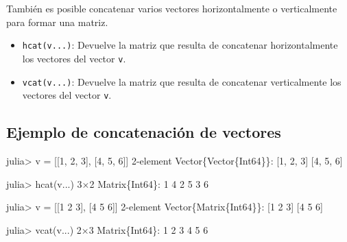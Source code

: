 \documentclass[
  letterpaper,
  DIV=11,
  numbers=noendperiod]{scrreprt}
\newenvironment{Shaded}{\begin{snugshade}}{\end{snugshade}}
\newcommand{\DataTypeTok}[1]{\textcolor[rgb]{0.68,0.00,0.00}{#1}}
\newcommand{\FloatTok}[1]{\textcolor[rgb]{0.68,0.00,0.00}{#1}}
\newcommand{\FunctionTok}[1]{\textcolor[rgb]{0.28,0.35,0.67}{#1}}
\newcommand{\NormalTok}[1]{\textcolor[rgb]{0.00,0.23,0.31}{#1}}
\newcommand{\OperatorTok}[1]{\textcolor[rgb]{0.37,0.37,0.37}{#1}}
\providecommand{\tightlist}{%
  \setlength{\itemsep}{0pt}\setlength{\parskip}{0pt}}\usepackage{longtable,booktabs,array}
\begin{document}
También es posible concatenar varios vectores horizontalmente o
verticalmente para formar una matriz.

\begin{itemize}
\tightlist
\item
  \texttt{hcat(v...)}: Devuelve la matriz que resulta de concatenar
  horizontalmente los vectores del vector \texttt{v}.
\item
  \texttt{vcat(v...)}: Devuelve la matriz que resulta de concatenar
  verticalmente los vectores del vector \texttt{v}.
\end{itemize}

\hypertarget{ejemplo-de-concatenaciuxf3n-de-vectores}{%
\subsection{Ejemplo de concatenación de
vectores}\label{ejemplo-de-concatenaciuxf3n-de-vectores}}

\begin{Shaded}
\begin{Highlighting}[]
\NormalTok{julia}\OperatorTok{\textgreater{}}\NormalTok{ v }\OperatorTok{=}\NormalTok{ [[}\FloatTok{1}\NormalTok{, }\FloatTok{2}\NormalTok{, }\FloatTok{3}\NormalTok{], [}\FloatTok{4}\NormalTok{, }\FloatTok{5}\NormalTok{, }\FloatTok{6}\NormalTok{]]}
\FloatTok{2}\OperatorTok{{-}}\NormalTok{element }\DataTypeTok{Vector}\NormalTok{\{}\DataTypeTok{Vector}\NormalTok{\{}\DataTypeTok{Int64}\NormalTok{\}\}}\OperatorTok{:}
\NormalTok{ [}\FloatTok{1}\NormalTok{, }\FloatTok{2}\NormalTok{, }\FloatTok{3}\NormalTok{]}
\NormalTok{ [}\FloatTok{4}\NormalTok{, }\FloatTok{5}\NormalTok{, }\FloatTok{6}\NormalTok{]}

\NormalTok{julia}\OperatorTok{\textgreater{}} \FunctionTok{hcat}\NormalTok{(v}\OperatorTok{...}\NormalTok{)}
\FloatTok{3}\OperatorTok{×}\FloatTok{2} \DataTypeTok{Matrix}\NormalTok{\{}\DataTypeTok{Int64}\NormalTok{\}}\OperatorTok{:}
 \FloatTok{1}  \FloatTok{4}
 \FloatTok{2}  \FloatTok{5}
 \FloatTok{3}  \FloatTok{6}

\NormalTok{julia}\OperatorTok{\textgreater{}}\NormalTok{ v }\OperatorTok{=}\NormalTok{ [[}\FloatTok{1} \FloatTok{2} \FloatTok{3}\NormalTok{], [}\FloatTok{4} \FloatTok{5} \FloatTok{6}\NormalTok{]]}
\FloatTok{2}\OperatorTok{{-}}\NormalTok{element }\DataTypeTok{Vector}\NormalTok{\{}\DataTypeTok{Matrix}\NormalTok{\{}\DataTypeTok{Int64}\NormalTok{\}\}}\OperatorTok{:}
\NormalTok{ [}\FloatTok{1} \FloatTok{2} \FloatTok{3}\NormalTok{]}
\NormalTok{ [}\FloatTok{4} \FloatTok{5} \FloatTok{6}\NormalTok{]}

\NormalTok{julia}\OperatorTok{\textgreater{}} \FunctionTok{vcat}\NormalTok{(v}\OperatorTok{...}\NormalTok{)}
\FloatTok{2}\OperatorTok{×}\FloatTok{3} \DataTypeTok{Matrix}\NormalTok{\{}\DataTypeTok{Int64}\NormalTok{\}}\OperatorTok{:}
 \FloatTok{1}  \FloatTok{2}  \FloatTok{3}
 \FloatTok{4}  \FloatTok{5}  \FloatTok{6}
\end{Highlighting}
\end{Shaded}
\end{document}
